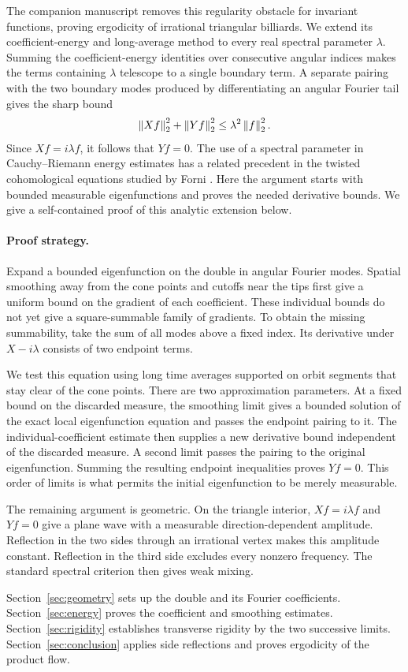 The companion manuscript \cite[Sections~2--6]{Companion} removes this
regularity obstacle for invariant functions, proving ergodicity of
irrational triangular billiards. We extend its coefficient-energy and
long-average method to every real spectral parameter \(\lambda\).
Summing the coefficient-energy identities over consecutive angular indices
makes the terms containing \(\lambda\) telescope to a single boundary term.
A separate pairing with the two boundary modes produced by differentiating
an angular Fourier tail gives the sharp bound
\[
 \left\lVert Xf\right\rVert_2^2+\left\lVert Yf\right\rVert_2^2\le\lambda^2\left\lVert f\right\rVert_2^2.
\]
Since \(Xf=i\lambda f\), it follows that \(Yf=0\).
The use of a spectral parameter in Cauchy--Riemann energy estimates has a
related precedent in the twisted cohomological equations studied by Forni
\cite[Section~3]{Forni2022}. Here the argument starts with bounded measurable
eigenfunctions and proves the needed derivative bounds. We give a
self-contained proof of this analytic extension below.

\paragraph{Proof strategy.}
Expand a bounded eigenfunction on the double in angular Fourier modes.
Spatial smoothing away from the cone points and cutoffs near the tips
first give a uniform bound on the gradient of each coefficient. These
individual bounds do not
yet give a square-summable family of gradients. To obtain the missing
summability, take the sum of all modes above a fixed index. Its derivative
under \(X-i\lambda\) consists of two endpoint terms.

We test this equation using long time averages supported on orbit segments
that stay clear of the cone points. There are two approximation parameters.
At a fixed bound on the discarded measure, the smoothing limit gives a
bounded solution of the exact local eigenfunction equation and passes the
endpoint pairing to it.
The individual-coefficient estimate then supplies a new derivative bound
independent of the discarded measure. A second limit passes the pairing
to the original eigenfunction. Summing the resulting endpoint inequalities
proves \(Yf=0\). This order of limits is what permits the initial
eigenfunction to be merely measurable.

The remaining argument is geometric. On the triangle interior,
\(Xf=i\lambda f\) and \(Yf=0\) give a plane wave with a measurable
direction-dependent amplitude. Reflection in the two sides through an
irrational vertex makes this amplitude constant. Reflection in the third
side excludes every nonzero frequency. The standard spectral criterion
then gives weak mixing.

Section~\ref{sec:geometry} sets up the double and its Fourier coefficients.
Section~\ref{sec:energy} proves the coefficient and smoothing estimates.
Section~\ref{sec:rigidity} establishes transverse rigidity by the two
successive limits. Section~\ref{sec:conclusion} applies side reflections
and proves ergodicity of the product flow.
